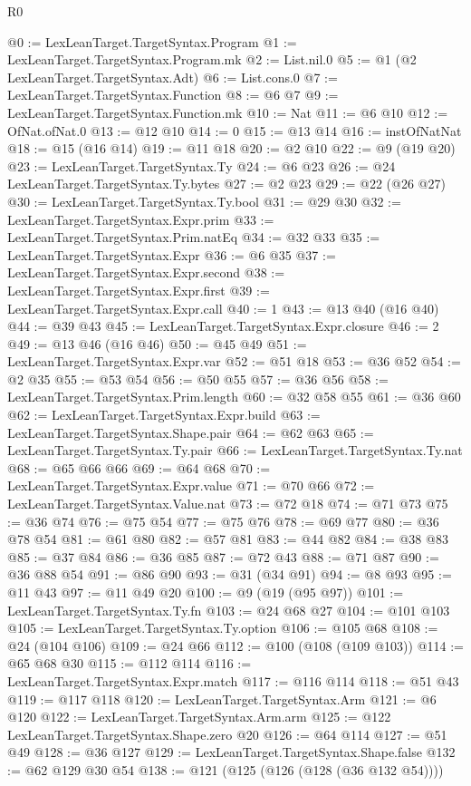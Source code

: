 \begin{lexlean}{R0}
\begin{coremodule}
{{{{{{{{{{{{{{{{{{{@0 := LexLeanTarget.TargetSyntax.Program
@1 := LexLeanTarget.TargetSyntax.Program.mk
@2 := List.nil.{0}
@5 := @1 (@2 LexLeanTarget.TargetSyntax.Adt)
@6 := List.cons.{0}
@7 := LexLeanTarget.TargetSyntax.Function
@8 := @6 @7
@9 := LexLeanTarget.TargetSyntax.Function.mk
@10 := Nat
@11 := @6 @10
@12 := OfNat.ofNat.{0}
@13 := @12 @10
@14 := 0
@15 := @13 @14
@16 := instOfNatNat
@18 := @15 (@16 @14)
@19 := @11 @18
@20 := @2 @10
@22 := @9 (@19 @20)
@23 := LexLeanTarget.TargetSyntax.Ty
@24 := @6 @23
@26 := @24 LexLeanTarget.TargetSyntax.Ty.bytes
@27 := @2 @23
@29 := @22 (@26 @27)
@30 := LexLeanTarget.TargetSyntax.Ty.bool
@31 := @29 @30
@32 := LexLeanTarget.TargetSyntax.Expr.prim
@33 := LexLeanTarget.TargetSyntax.Prim.natEq
@34 := @32 @33
@35 := LexLeanTarget.TargetSyntax.Expr
@36 := @6 @35
@37 := LexLeanTarget.TargetSyntax.Expr.second
@38 := LexLeanTarget.TargetSyntax.Expr.first
@39 := LexLeanTarget.TargetSyntax.Expr.call
@40 := 1
@43 := @13 @40 (@16 @40)
@44 := @39 @43
@45 := LexLeanTarget.TargetSyntax.Expr.closure
@46 := 2
@49 := @13 @46 (@16 @46)
@50 := @45 @49
@51 := LexLeanTarget.TargetSyntax.Expr.var
@52 := @51 @18
@53 := @36 @52
@54 := @2 @35
@55 := @53 @54
@56 := @50 @55
@57 := @36 @56
@58 := LexLeanTarget.TargetSyntax.Prim.length
@60 := @32 @58 @55
@61 := @36 @60
@62 := LexLeanTarget.TargetSyntax.Expr.build
@63 := LexLeanTarget.TargetSyntax.Shape.pair
@64 := @62 @63
@65 := LexLeanTarget.TargetSyntax.Ty.pair
@66 := LexLeanTarget.TargetSyntax.Ty.nat
@68 := @65 @66 @66
@69 := @64 @68
@70 := LexLeanTarget.TargetSyntax.Expr.value
@71 := @70 @66
@72 := LexLeanTarget.TargetSyntax.Value.nat
@73 := @72 @18
@74 := @71 @73
@75 := @36 @74
@76 := @75 @54
@77 := @75 @76
@78 := @69 @77
@80 := @36 @78 @54
@81 := @61 @80
@82 := @57 @81
@83 := @44 @82
@84 := @38 @83
@85 := @37 @84
@86 := @36 @85
@87 := @72 @43
@88 := @71 @87
@90 := @36 @88 @54
@91 := @86 @90
@93 := @31 (@34 @91)
@94 := @8 @93
@95 := @11 @43
@97 := @11 @49 @20
@100 := @9 (@19 (@95 @97))
@101 := LexLeanTarget.TargetSyntax.Ty.fn
@103 := @24 @68 @27
@104 := @101 @103
@105 := LexLeanTarget.TargetSyntax.Ty.option
@106 := @105 @68
@108 := @24 (@104 @106)
@109 := @24 @66
@112 := @100 (@108 (@109 @103))
@114 := @65 @68 @30
@115 := @112 @114
@116 := LexLeanTarget.TargetSyntax.Expr.match
@117 := @116 @114
@118 := @51 @43
@119 := @117 @118
@120 := LexLeanTarget.TargetSyntax.Arm
@121 := @6 @120
@122 := LexLeanTarget.TargetSyntax.Arm.arm
@125 := @122 LexLeanTarget.TargetSyntax.Shape.zero @20
@126 := @64 @114
@127 := @51 @49
@128 := @36 @127
@129 := LexLeanTarget.TargetSyntax.Shape.false
@132 := @62 @129 @30 @54
@138 := @121 (@125 (@126 (@128 (@36 @132 @54))))
}}}}}}}}}}}}}}}}}}}
\end{coremodule}
\end{lexlean}
